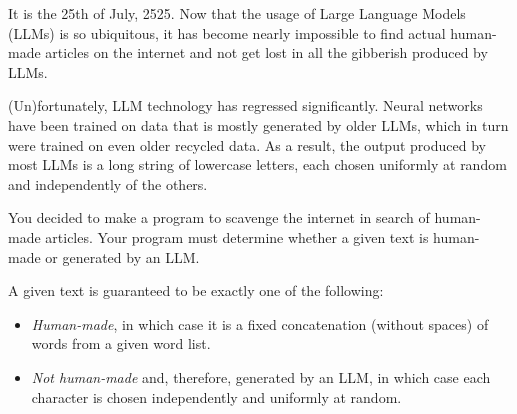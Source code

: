 








It is the 25th of July, 2525.
Now that the usage of Large Language Models (LLMs) is so ubiquitous,
it has become nearly impossible to find actual human-made articles on the internet and not get lost in all the gibberish produced by LLMs.

(Un)fortunately, LLM technology has regressed significantly.
Neural networks have been trained on data that is mostly generated by older LLMs, which in turn were trained on even older recycled data.
As a result, the output produced by most LLMs is a long string of lowercase letters, each chosen uniformly at random and independently of the others.

You decided to make a program to scavenge the internet in search of human-made articles.
Your program must determine whether a given text is human-made or generated by an LLM.

A given text is guaranteed to be exactly one of the following:
\begin{itemize}
    \item \emph{Human-made}, in which case it is a fixed concatenation (without spaces) of words from a given word list.
    \item \emph{Not human-made} and, therefore, generated by an LLM, in which case each character is chosen independently and uniformly at random.
\end{itemize}

